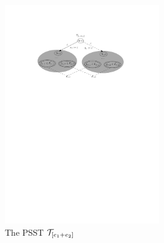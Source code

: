 		\begin{figure}[ht]
			\centering
			\includegraphics[width = 0.6\textwidth]{reg2pfa-1.pdf}
			\caption{The PSST $\mathcal{T}_{[e_1+e_2]}$}
			\label{fig-reg2pfa-1}
		\end{figure}  


